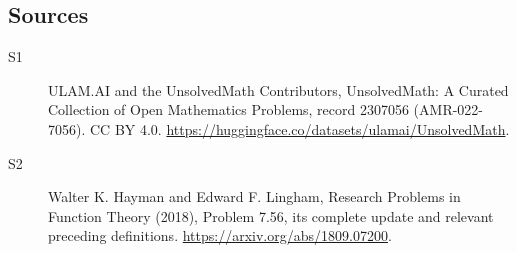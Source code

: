 \documentclass[11pt]{article}
\begin{document}
\subsection{Sources}
\begin{description}
\item[\hypertarget{source:2307056:1}{S1}] ULAM.AI and the UnsolvedMath Contributors, UnsolvedMath: A Curated Collection of Open Mathematics Problems, record 2307056 (AMR-022-7056). CC BY 4.0. \url{https://huggingface.co/datasets/ulamai/UnsolvedMath}.
\item[\hypertarget{source:2307056:2}{S2}] Walter K. Hayman and Edward F. Lingham, Research Problems in Function Theory (2018), Problem 7.56, its complete update and relevant preceding definitions. \url{https://arxiv.org/abs/1809.07200}.
\end{description}
\label{end:2307056}
\end{document}
